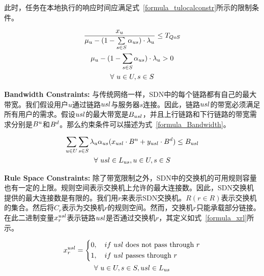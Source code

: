此时，任务在本地执行的响应时间应满足式~\eqref{formula_tulocalconstr}所示的限制条件。

\begin{equation}
\label{formula_tulocalconstr}
\begin{gathered}
\frac{{x}_{u}}{{\mu}_{u} - (1 - \sum\limits_{s \in S} {\alpha}_{us}) \cdot {\lambda}_{u}} \leq T_{QoS}\\
{\mu}_{u} - (1 - \sum\limits_{s \in S}{\alpha}_{us}) \cdot {\lambda}_{u} > 0\\
\forall \ u\in U, s\in S\\
\end{gathered}
\end{equation}

\textbf{Bandwidth Constraints:}
与传统网络一样，SDN中的每个链路都有自己的最大带宽。我们假设用户$u$通过链路$usl$与服务器$s$连接。因此，链路$usl$的带宽必须满足所有用户的需求。假设$usl$的最大带宽是$B_{usl}$，并且上行链路和下行链路的带宽需求分别是$B^{u}$和$B^{d}$。那么约束条件可以描述为式~\eqref{formula_Bandwidth}。

\begin{equation}
\label{formula_Bandwidth}
\begin{gathered}
\sum\limits_{u \in U} \sum\limits_{s\in S}{\lambda}_{u}{\alpha}_{us}(x_{usl} \cdot B^{u} + y_{usl} \cdot B^{d}) \leq B_{usl}\\
\forall \ usl\in L_{us}, u\in U, s\in S\\
\end{gathered}
\end{equation}

\textbf{Rule Space Constraints:}
除了带宽限制之外，SDN中的交换机的可用规则容量也有一定的上限。规则空间表示交换机上允许的最大连接数。因此，SDN交换机提供的最大连接数是有限的。我们用$r$来表示SDN交换机。$R (r \in R)$表示交换机的集合。然后将$C_r$表示为交换机$r$的规则空间。然而，交换机$r$只能承载部分链接。在此二进制变量$x^{usl}_{r}$表示链路$usl$是否通过交换机$r$，其定义如式~\eqref{formula_xrl}所示。

\begin{equation}
\label{formula_xrl}
\begin{gathered}
\begin{aligned}
x^{usl}_{r} = \left\{\begin{aligned}
& 0,\quad if\ usl \text{ does not pass through }r\\
& 1,\quad if\ usl \text{ passes through }r\\
\end{aligned}
\right.
\end{aligned}
\\\forall \ u \in U, s \in S, usl\in L_{us}\\
\end{gathered}
\end{equation}

